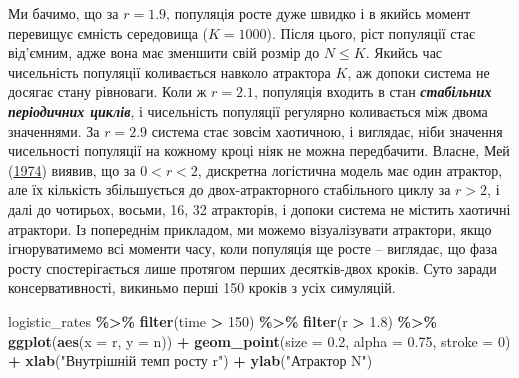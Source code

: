 \documentclass[
  11pt,
]{book}
\newenvironment{Shaded}{\begin{snugshade}}{\end{snugshade}}
\newcommand{\AttributeTok}[1]{\textcolor[rgb]{0.13,0.29,0.53}{#1}}
\newcommand{\DecValTok}[1]{\textcolor[rgb]{0.00,0.00,0.81}{#1}}
\newcommand{\FloatTok}[1]{\textcolor[rgb]{0.00,0.00,0.81}{#1}}
\newcommand{\FunctionTok}[1]{\textcolor[rgb]{0.13,0.29,0.53}{\textbf{#1}}}
\newcommand{\NormalTok}[1]{#1}
\newcommand{\SpecialCharTok}[1]{\textcolor[rgb]{0.81,0.36,0.00}{\textbf{#1}}}
\newcommand{\StringTok}[1]{\textcolor[rgb]{0.31,0.60,0.02}{#1}}
\begin{document}
Ми бачимо, що за \(r = 1.9\), популяція росте дуже швидко і в якийсь момент перевищує ємність середовища (\(K = 1000\)). Після цього, ріст популяції стає від'ємним, адже вона має зменшити свій розмір до \(N \leq K\). Якийсь час чисельність популяції коливається навколо атрактора \(K\), аж допоки система не досягає стану рівноваги. Коли ж \(r = 2.1\), популяція входить в стан \textbf{\emph{стабільних періодичних циклів}}, і чисельність популяції регулярно коливається між двома значеннями. За \(r = 2.9\) система стає зовсім хаотичною, і виглядає, ніби значення чисельності популяції на кожному кроці ніяк не можна передбачити. Власне, Мей (\href{https://doi.org/10.1126/science.186.4164.645}{1974}) виявив, що за \(0 < r < 2\), дискретна логістична модель має один атрактор, але їх кількість збільшується до двох-атракторного стабільного циклу за \(r > 2\), і далі до чотирьох, восьми, 16, 32 атракторів, і допоки система не містить хаотичні атрактори. Із попереднім прикладом, ми можемо візуалізувати атрактори, якщо ігноруватимемо всі моменти часу, коли популяція ще росте -- виглядає, що фаза росту спостерігається лише протягом перших десятків-двох кроків. Суто заради консервативності, викиньмо перші 150 кроків з усіх симуляцій.

\begin{Shaded}
\begin{Highlighting}[]
\NormalTok{logistic\_rates }\SpecialCharTok{\%\textgreater{}\%} 
  \FunctionTok{filter}\NormalTok{(time }\SpecialCharTok{\textgreater{}} \DecValTok{150}\NormalTok{) }\SpecialCharTok{\%\textgreater{}\%}
  \FunctionTok{filter}\NormalTok{(r }\SpecialCharTok{\textgreater{}} \FloatTok{1.8}\NormalTok{) }\SpecialCharTok{\%\textgreater{}\%}
  \FunctionTok{ggplot}\NormalTok{(}\FunctionTok{aes}\NormalTok{(}\AttributeTok{x =}\NormalTok{ r, }\AttributeTok{y =}\NormalTok{ n)) }\SpecialCharTok{+}
  \FunctionTok{geom\_point}\NormalTok{(}\AttributeTok{size =} \FloatTok{0.2}\NormalTok{, }\AttributeTok{alpha =} \FloatTok{0.75}\NormalTok{, }\AttributeTok{stroke =} \DecValTok{0}\NormalTok{) }\SpecialCharTok{+}
  \FunctionTok{xlab}\NormalTok{(}\StringTok{"Внутрішній темп росту r"}\NormalTok{) }\SpecialCharTok{+}
  \FunctionTok{ylab}\NormalTok{(}\StringTok{"Атрактор N"}\NormalTok{)}
\end{Highlighting}
\end{Shaded}
\end{document}

